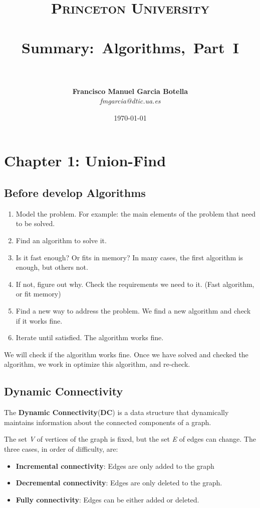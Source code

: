 \documentclass[paper=a4, fontsize=11pt]{scrartcl} %
\title{	
\normalfont \normalsize 
\textsc{Princeton University} \\ [25pt] %
\horrule{0.5pt} \\[0.4cm] %
\huge Summary:\ Algorithms,\ Part\ I \\ %
\horrule{2pt} \\[0.5cm] %
}
\author{\textbf{Francisco Manuel Garcia Botella}\\ \textit{fmgarcia@dtic.ua.es}} %
\date{\normalsize\today} %
\numberwithin{equation}{section} %
\numberwithin{figure}{section} %
\numberwithin{table}{section} %
\begin{document}
\maketitle %


\section{Chapter 1: Union-Find}
\subsection{Before develop Algorithms}
\begin{enumerate}
\item Model the problem. For example: the main elements of the problem that need to be solved.
\item Find an algorithm to solve it. 
\item Is it fast enough? Or fits in memory? In many cases, the first algorithm is enough, but others not.
\item If not, figure out why. Check the requirements we need to it. (Fast algorithm, or fit memory)
\item Find a new way to address the problem. We find a new algorithm and check if it works fine.
\item Iterate until satisfied. The algorithm works fine.
\end{enumerate}

We will check if the algorithm works fine. Once we have solved and checked the algorithm, we work in optimize this algorithm, and re-check.
\subsection{Dynamic Connectivity}
The \textbf{Dynamic Connectivity}(\textbf{DC}) is a data structure that dynamically maintains information about the connected components of a graph.

The set \textit{V} of vertices of the graph is fixed, but the set \textit{E} of edges can change. The three cases, in order of difficulty, are:
\begin{itemize}
\item \textbf{Incremental connectivity}: Edges are only added to the graph
\item \textbf{Decremental connectivity}: Edges are only deleted to the graph.
\item \textbf{Fully connectivity}: Edges can be either added or deleted. 
\end{itemize}
\end{document}
